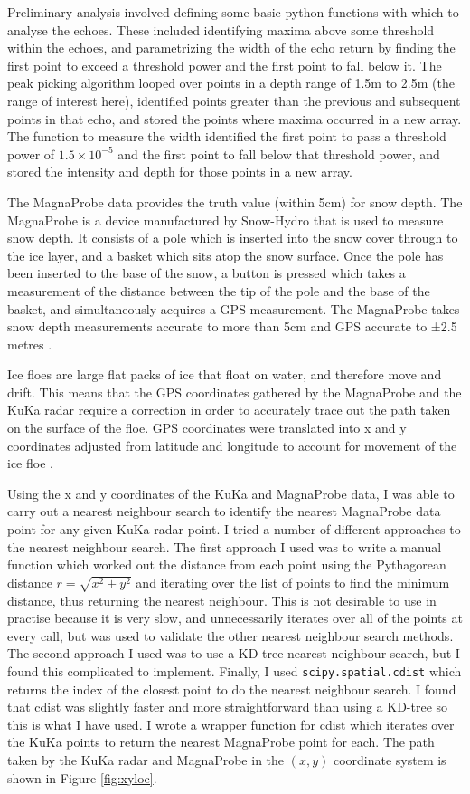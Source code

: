 \documentclass[11pt, a4paper]{article}
\begin{document}
Preliminary analysis involved defining some basic python functions with which to analyse the echoes. These included identifying maxima above some threshold within the echoes, and parametrizing the width of the echo return by finding the first point to exceed a threshold power and the first point to fall below it.  The peak picking algorithm looped over points in a depth range of 1.5m to 2.5m (the range of interest here),  identified points greater than the previous and subsequent points in that echo,  and stored the points where maxima occurred in a new array.  The function to measure the width identified the first point to pass a threshold power of $1.5\times 10^{-5}$ and the first point to fall below that threshold power, and stored the intensity and depth for those points in a new array.

The MagnaProbe data provides the truth value (within 5cm) for snow depth. The MagnaProbe is a device manufactured by Snow-Hydro that is used to measure snow depth.  It consists of a pole which is inserted into the snow cover through to the ice layer, and a basket which sits atop the snow surface. Once the pole has been inserted to the base of the snow, a button is pressed which takes a measurement of the distance between the tip of the pole and the base of the basket, and simultaneously acquires a GPS measurement.  The MagnaProbe takes snow depth measurements accurate to more than 5cm and GPS accurate to ±2.5 metres \cite{magnaprobe}. 

Ice floes are large flat packs of ice that float on water, and therefore move and drift. This means that the GPS coordinates gathered by the MagnaProbe and the KuKa radar require a correction in order to accurately trace out the path taken on the surface of the floe.  GPS coordinates were translated into x and y coordinates adjusted from latitude and longitude to account for movement of the ice floe \cite{stroeve}.

Using the x and y coordinates of the KuKa and MagnaProbe data, I was able to carry out a nearest neighbour search to identify the nearest MagnaProbe data point for any given KuKa radar point. I tried a number of different approaches to the nearest neighbour search. The first approach I used was to write a manual function which worked out the distance from each point using the Pythagorean distance $ r = \sqrt{x^2 + y^2}$ and iterating over the list of points to find the minimum distance, thus returning the nearest neighbour. This is not desirable to use in practise because it is very slow, and unnecessarily iterates over all of the points at every call, but was used to validate the other nearest neighbour search methods. The second approach I used was to use a KD-tree nearest neighbour search, but I found this complicated to implement. Finally, I used \verb|scipy.spatial.cdist| which returns the index of the closest point to do the nearest neighbour search. I found that cdist was slightly faster and more straightforward than using a KD-tree so this is what I have used. I wrote a wrapper function for cdist which iterates over the KuKa points to return the nearest MagnaProbe point for each.  The path taken by the KuKa radar and MagnaProbe in the $(x, y)$ coordinate system is shown in Figure \ref{fig:xyloc}.
\end{document}
